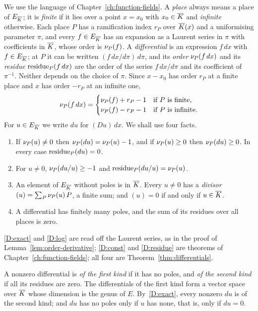 We use the language of Chapter~\ref{ch:function-fields}. A \emph{place} always
means a place of $E_{\overline{K}}$; it is \emph{finite} if it lies over a point $x
= x_0$ with $x_0 \in \overline{K}$ and \emph{infinite} otherwise. Each place $P$ has a
ramification index $r_P$ over $\overline{K}(x)$ and a uniformising parameter $\pi$,
and every $f \in E_{\overline{K}}$ has an expansion as a Laurent series in $\pi$ with
coefficients in $\overline{K}$, whose order is $\nu_{P}(f)$. A \emph{differential} is
an expression $f\,dx$ with $f \in E_{\overline{K}}$; at $P$ it can be written $(f\,
dx/d\pi)\, d\pi$, and its \emph{order} $\nu_{P}(f\,dx)$ and its \emph{residue}
$\operatorname{residue}_P(f\,dx)$ are the order of the series $f\,dx/d\pi$ and its
coefficient of $\pi^{-1}$. Neither depends on the choice of $\pi$. Since $x -
x_0$ has order $r_P$ at a finite place and $x$ has order $-r_P$ at an infinite
one,
\begin{equation}\label{eq:order-dx}
  \nu_{P}(f\,dx) =
  \begin{cases}
    \nu_{P}(f) + r_P - 1 & \text{if $P$ is finite,} \\
    \nu_{P}(f) - r_P - 1 & \text{if $P$ is infinite.}
  \end{cases}
\end{equation}
For $u \in E_{\overline{K}}$ we write $du$ for $(Du)\,dx$. We shall use four facts.
\begin{enumerate}[label=\textup{(D\arabic*)}]
\item\label{D:exact} If $\nu_{P}(u) \ne 0$ then $\nu_{P}(du) = \nu_{P}(u) -
  1$, and if $\nu_{P}(u) \ge 0$ then $\nu_{P}(du) \ge 0$. In every case
  $\operatorname{residue}_P(du) = 0$.
\item\label{D:log} For $u \ne 0$, $\nu_{P}(du/u) \ge -1$ and
  $\operatorname{residue}_P(du/u) = \nu_{P}(u)$.
\item\label{D:const} An element of $E_{\overline{K}}$ without poles is in $\overline{K}$.
  Every $u \ne 0$ has a \emph{divisor} $(u) = \sum_P \nu_{P}(u)\, P$, a finite
  sum; and $(u) = 0$ if and only if $u \in \overline{K}$.
\item\label{D:residue} A differential has finitely many poles, and the sum of
  its residues over all places is zero.
\end{enumerate}
\ref{D:exact} and \ref{D:log} are read off the Laurent series, as in the
proof of Lemma~\ref{lem:order-derivative}; \ref{D:const} and
\ref{D:residue} are theorems of Chapter~\ref{ch:function-fields}; all four
are Theorem~\ref{thm:differentials}.

A nonzero differential is \emph{of the first kind} if it has no poles, and
\emph{of the second kind} if all its residues are zero. The differentials of
the first kind form a vector space over $\overline{K}$ whose dimension is the genus
of $E$. By~\ref{D:exact}, every nonzero $du$ is of the second kind; and $du$
has no poles only if $u$ has none, that is, only if $du = 0$.

